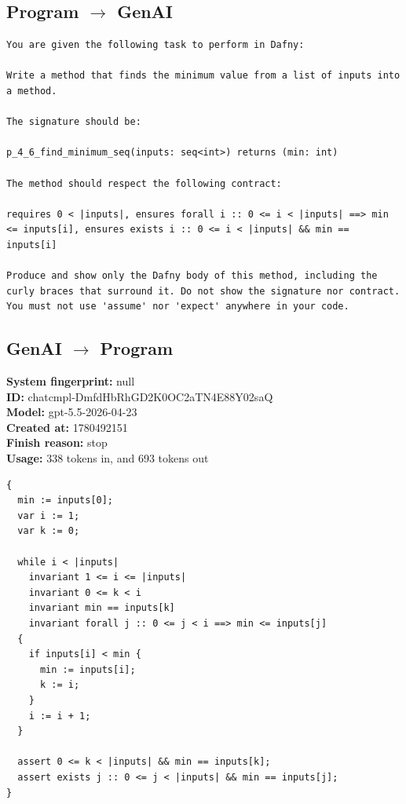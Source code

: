 \documentclass{article}
\begin{document}
\subsection*{Program $\rightarrow$ GenAI}
\begin{lstlisting}
You are given the following task to perform in Dafny:

Write a method that finds the minimum value from a list of inputs into a method.

The signature should be:

p_4_6_find_minimum_seq(inputs: seq<int>) returns (min: int)

The method should respect the following contract:

requires 0 < |inputs|, ensures forall i :: 0 <= i < |inputs| ==> min <= inputs[i], ensures exists i :: 0 <= i < |inputs| && min == inputs[i]

Produce and show only the Dafny body of this method, including the curly braces that surround it. Do not show the signature nor contract. You must not use 'assume' nor 'expect' anywhere in your code.
\end{lstlisting}
\subsection*{GenAI $\rightarrow$ Program}
\textbf{System fingerprint: }null
\\\textbf{ID: }chatcmpl-DmfdHbRhGD2K0OC2aTN4E88Y02saQ
\\\textbf{Model: }gpt-5.5-2026-04-23
\\\textbf{Created at: }1780492151
\\\textbf{Finish reason: }stop
\\\textbf{Usage: }338 tokens in, and 693 tokens out
\begin{lstlisting}
{
  min := inputs[0];
  var i := 1;
  var k := 0;

  while i < |inputs|
    invariant 1 <= i <= |inputs|
    invariant 0 <= k < i
    invariant min == inputs[k]
    invariant forall j :: 0 <= j < i ==> min <= inputs[j]
  {
    if inputs[i] < min {
      min := inputs[i];
      k := i;
    }
    i := i + 1;
  }

  assert 0 <= k < |inputs| && min == inputs[k];
  assert exists j :: 0 <= j < |inputs| && min == inputs[j];
}
\end{lstlisting}
\end{document}
